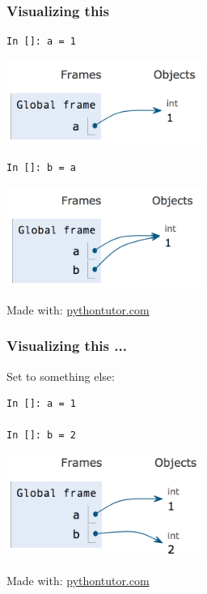 \documentclass[14pt,compress,aspectratio=169]{beamer}
\begin{document}
\begin{frame}[fragile]
  \frametitle{Visualizing this}
  \begin{minipage}{0.4\textwidth}
    \begin{lstlisting}
In []: a = 1
    \end{lstlisting}
  \end{minipage}
  \begin{minipage}{0.4\textwidth}
    \includegraphics[width=2.5in]{data/a_eq_1.png}
  \end{minipage}
\pause
  \begin{minipage}{0.4\textwidth}
    \begin{lstlisting}
In []: b = a
    \end{lstlisting}
  \end{minipage}
  \begin{minipage}{0.4\textwidth}
    \includegraphics[width=2.5in]{data/a_b_eq_1.png}
  \end{minipage}

  {\small Made with: \url{pythontutor.com}}
\end{frame}

\begin{frame}[fragile]
  \frametitle{Visualizing this ...}
  Set  to something else:

  \begin{minipage}{0.4\textwidth}
    \begin{lstlisting}
In []: a = 1

In []: b = 2
    \end{lstlisting}
  \end{minipage}
  \begin{minipage}{0.4\textwidth}
    \includegraphics[width=2.5in]{data/a_1_b_2.png}
  \end{minipage}

  \vspace*{1in}
  {\small Made with: \url{pythontutor.com}}
\end{frame}
\end{document}

